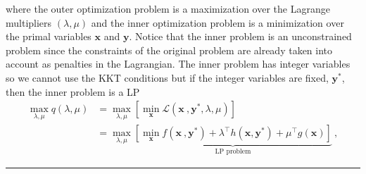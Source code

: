 where the outer optimization problem is a maximization over the Lagrange multipliers $\left(\lambda,\mu\right)$ and the inner optimization problem is a minimization over the primal variables $\mathbf{x}$ and $\mathbf{y}$. Notice that the inner problem is an unconstrained problem since the constraints of the original problem are already taken into account as penalties in the Lagrangian. The inner problem has integer variables so we cannot use the KKT conditions but if the integer variables are fixed, $\mathbf{y}^{*}$, then the inner problem is a LP
\begin{align}
    \max_{\lambda,\mu} q(\lambda,\mu) &=\max_{\lambda,\mu}\left[\min_{\mathbf{x}}\mathcal{L}(\mathbf{x}\ , \mathbf{y}^{*},\lambda,\mu)\right] \\
    &= \max_{\lambda,\mu}\underbrace{\left[\min_{\mathbf{x}}f(\mathbf{x}\ , \mathbf{y}^{*}) + \lambda^{\intercal}h(\mathbf{x}, \mathbf{y}^{*}) + \mu^{\intercal}g(\mathbf{x})\right]}_{\textrm{LP problem}}\ ,
\end{align}
  \vspace{6pt}
    \hrule

